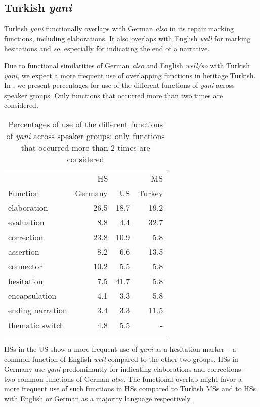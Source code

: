 \documentclass[output=paper,colorlinks,citecolor=brown]{langscibook}
\begin{document}
\subsection{Turkish \emph{yani}}
\label{sec:sub:labrenzetal:Turkish_yani}
Turkish \textit{yani} functionally overlaps with German \textit{also} in its repair marking functions, including elaborations. It also overlaps with English \textit{well} for marking hesitations and \textit{so}, especially for indicating the end of a narrative.

Due to functional similarities of German \textit{also} and English \textit{well/so} with Turkish \textit{yani}, we expect a more frequent use of overlapping functions in heritage Turkish. In , we present percentages for use of the different functions of \textit{yani} across speaker groups. Only functions that occurred more than two times are considered.

\begin{table}
\caption{Percentages of use of the different functions of \textit{yani} across speaker groups; only functions that occurred more than 2 times are considered}
\label{tab:labrenzetal:6}
 \centering
 \begin{tabular}{ l rrr }
  \lsptoprule
            & \multicolumn{2}{c}{HS} & MS  \\\cmidrule(lr){2-3} \cmidrule(lr){4-4}
  Function  &   Germany  &    US  &    Turkey  \\
  \midrule
  elaboration  &   26.5  &    18.7  &    19.2  \\
  evaluation  &   8.8 &   4.4  &    32.7 \\
  correction  &   23.8 &   10.9  &    5.8   \\
  assertion  &   8.2 &   6.6  &    13.5   \\
  connector  &   10.2 &   5.5  &    5.8    \\
  hesitation  &   7.5 &   41.7  &    5.8    \\
  encapsulation  &   4.1 &   3.3  &    5.8    \\
  ending narration  &   3.4 &   3.3  &    11.5    \\
  thematic switch  &   4.8 &   5.5  &    -    \\
  \lspbottomrule
 \end{tabular}
\end{table}

\noindent HSs in the US show a more frequent use of \textit{yani} as a hesitation marker  – a common function of English \textit{well} \citep[cf.][]{aijmer_well_2011} compared to the other two groups. HSs in Germany use \textit{yani} predominantly for indicating elaborations  and corrections – two common functions of German \textit{also}. The functional overlap might favor a more frequent use of such functions in HSs compared to Turkish MSs and to HSs with English or German as a majority language respectively. 
\end{document}
